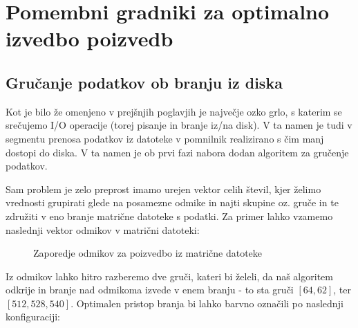 \documentclass[a4paper,12pt,openright]{book}
\begin{document}
    \newpage
    \section{Pomembni gradniki za optimalno izvedbo poizvedb}
        
        \subsection{Gručanje podatkov ob branju iz diska}
        
        Kot je bilo že omenjeno v prejšnjih poglavjih je največje ozko grlo, s katerim se srečujemo I/O operacije (torej pisanje in branje iz/na disk). V ta namen je tudi v segmentu prenosa podatkov iz datoteke v pomnilnik realizirano s čim manj dostopi do diska. V ta namen je ob prvi fazi nabora dodan algoritem za gručenje podatkov.

        Sam problem je zelo preprost imamo urejen vektor celih števil, kjer želimo vrednosti grupirati glede na posamezne odmike in najti skupine oz. gruče in te združiti v eno branje matrične datoteke s podatki. Za primer lahko vzamemo naslednji vektor odmikov v matrični datoteki:

\hfill \break
\begin{figure}[h]
\begin{center}
\caption{Zaporedje odmikov za poizvedbo iz matrične datoteke}
\end{center}
\end{figure}

\noindent Iz odmikov lahko hitro razberemo dve gruči, kateri bi želeli, da naš algoritem odkrije in branje nad odmikoma izvede v enem branju - to sta gruči $[64, 62]$, ter $[512, 528, 540]$. Optimalen pristop branja bi lahko barvno označili po naslednji konfiguraciji:
\end{document}
